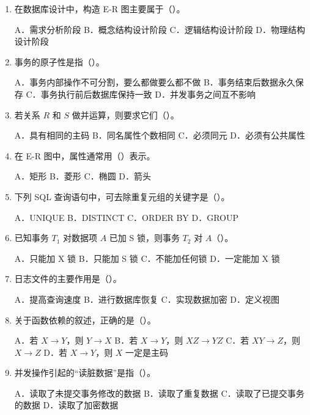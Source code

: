 \documentclass{../../note}
\begin{document}
\begin{enumerate}[itemsep=0.8em]
\item 在数据库设计中，构造 E-R 图主要属于（\hspace{0.8cm}）。

A．需求分析阶段 \quad B．概念结构设计阶段 \quad C．逻辑结构设计阶段 \quad D．物理结构设计阶段

\item 事务的原子性是指（\hspace{0.8cm}）。

A．事务内部操作不可分割，要么都做要么都不做
\quad B．事务结束后数据永久保存
\quad C．事务执行前后数据库保持一致
\quad D．并发事务之间互不影响

\item 若关系 $R$ 和 $S$ 做并运算，则要求它们（\hspace{0.8cm}）。

A．具有相同的主码 \quad B．同名属性个数相同 \quad C．必须同元 \quad D．必须有公共属性

\item 在 E-R 图中，属性通常用（\hspace{0.8cm}）表示。

A．矩形 \quad B．菱形 \quad C．椭圆 \quad D．箭头

\item 下列 SQL 查询语句中，可去除重复元组的关键字是（\hspace{0.8cm}）。

A．UNIQUE \quad B．DISTINCT \quad C．ORDER BY \quad D．GROUP

\item 已知事务 $T_1$ 对数据项 $A$ 已加 S 锁，则事务 $T_2$ 对 $A$（\hspace{0.8cm}）。

A．只能加 X 锁 \quad B．只能加 S 锁 \quad C．不能加任何锁 \quad D．一定能加 X 锁

\item 日志文件的主要作用是（\hspace{0.8cm}）。

A．提高查询速度 \quad B．进行数据库恢复 \quad C．实现数据加密 \quad D．定义视图

\item 关于函数依赖的叙述，正确的是（\hspace{0.8cm}）。

A．若 $X \rightarrow Y$，则 $Y \rightarrow X$
\quad B．若 $X \rightarrow Y$，则 $XZ \rightarrow YZ$
\quad C．若 $XY \rightarrow Z$，则 $X \rightarrow Z$
\quad D．若 $X \rightarrow Y$，则 $X$ 一定是主码

\item 并发操作引起的“读脏数据”是指（\hspace{0.8cm}）。

A．读取了未提交事务修改的数据
\quad B．读取了重复数据
\quad C．读取了已提交事务的数据
\quad D．读取了加密数据
\end{enumerate}
\end{document}

